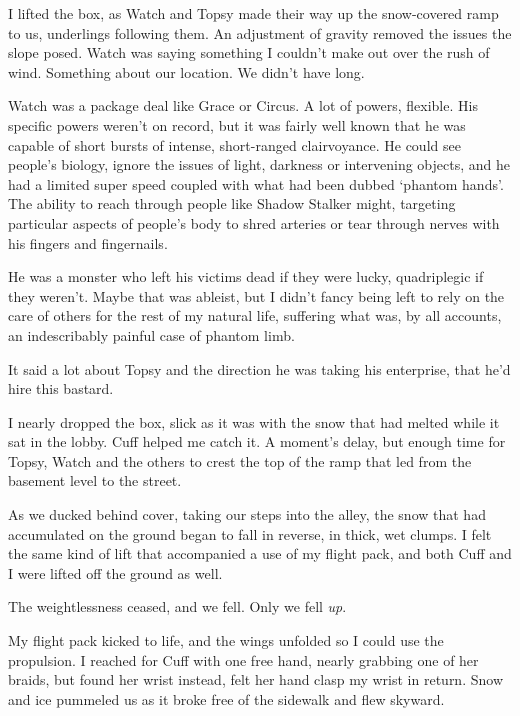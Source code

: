I lifted the box, as Watch and Topsy made their way up the snow-covered ramp to us, underlings following them.  An adjustment of gravity removed the issues the slope posed.  Watch was saying something I couldn't make out over the rush of wind.  Something about our location.  We didn't have long.



Watch was a package deal like Grace or Circus.  A lot of powers, flexible.  His specific powers weren't on record, but it was fairly well known that he was capable of short bursts of intense, short-ranged clairvoyance.  He could see people's biology, ignore the issues of light, darkness or intervening objects, and he had a limited super speed coupled with what had been dubbed `phantom hands'.  The ability to reach through people like Shadow Stalker might, targeting particular aspects of people's body to shred arteries or tear through nerves with his fingers and fingernails.



He was a monster who left his victims dead if they were lucky, quadriplegic if they weren't.  Maybe that was ableist, but I didn't fancy being left to rely on the care of others for the rest of my natural life, suffering what was, by all accounts, an indescribably painful case of phantom limb.



It said a lot about Topsy and the direction he was taking his enterprise, that he'd hire this bastard.



I nearly dropped the box, slick as it was with the snow that had melted while it sat in the lobby.  Cuff helped me catch it.  A moment's delay, but enough time for Topsy, Watch and the others to crest the top of the ramp that led from the basement level to the street.



As we ducked behind cover, taking our steps into the alley, the snow that had accumulated on the ground began to fall in reverse, in thick, wet clumps.  I felt the same kind of lift that accompanied a use of my flight pack, and both Cuff and I were lifted off the ground as well.



The weightlessness ceased, and we fell.  Only we fell \emph{up}.



My flight pack kicked to life, and the wings unfolded so I could use the propulsion.  I reached for Cuff with one free hand, nearly grabbing one of her braids, but found her wrist instead, felt her hand clasp my wrist in return.  Snow and ice pummeled us as it broke free of the sidewalk and flew skyward.



